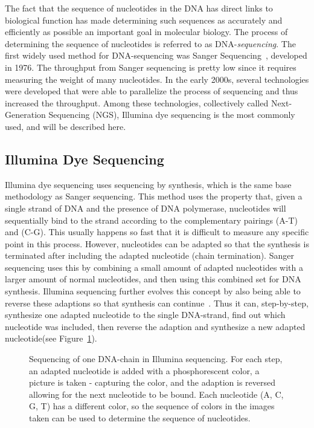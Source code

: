 The fact that the sequence of nucleotides in the DNA has direct links to biological function has made determining such sequences as accurately and efficiently as possible an important goal in molecular biology.
The process of determining the sequence of nucleotides is referred to as DNA-\emph{sequencing}.
The first widely used method for DNA-sequencing was Sanger Sequencing~\cite{sanger}, developed in 1976.
The throughput from Sanger sequencing is pretty low since it requires measuring the weight of many nucleotides.
In the early 2000s, several technologies were developed that were able to parallelize the process of sequencing and thus increased the throughput.
Among these technologies, collectively called Next-Generation Sequencing (NGS), Illumina dye sequencing is the most commonly used, and will be described here.

\subsection{Illumina Dye Sequencing}
Illumina dye sequencing uses sequencing by synthesis, which is the same base methodology as Sanger sequencing.
This method uses the property that, given a single strand of DNA and the presence of DNA polymerase, nucleotides will sequentially bind to the strand according to the complementary pairings (A-T) and (C-G).
This usually happens so fast that it is difficult to measure any specific point in this process.
However, nucleotides can be adapted so that the synthesis is terminated after including the adapted nucleotide (chain termination).
Sanger sequencing uses this by combining a small amount of adapted nucleotides with a larger amount of normal nucleotides, and then using this combined set for DNA synthesis.
Illumina sequencing further evolves this concept by also being able to reverse these adaptions so that synthesis can continue~\cite{reversiblechain}.
Thus it can, step-by-step, synthesize one adapted nucleotide to the single DNA-strand, find out which nucleotide was included, then reverse the adaption and synthesize a new adapted nucleotide(see Figure~\ref{fig:illumina}).
\begin{figure}
  \tikzpicture
  
  \endtikzpicture
  \caption{
    Sequencing of one DNA-chain in Illumina sequencing.
    For each step, an adapted nucleotide is added with a phosphorescent color, a picture is taken - capturing the color, and the adaption is reversed allowing for the next nucleotide to be bound.
    Each nucleotide (A, C, G, T) has a different color, so the sequence of colors in the images taken can be used to determine the sequence of nucleotides.}
  \label{fig:illumina}
\end{figure}

